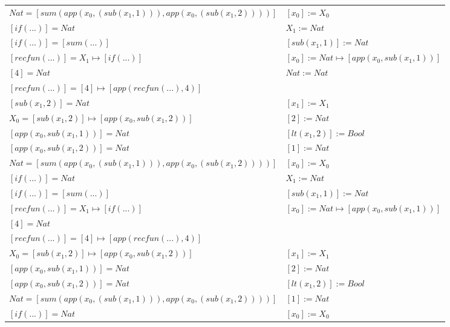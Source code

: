 \begin{exercise}
\begin{description}
\begin{center}
\begin{longtable}{ | l | l | }
                        $Nat = [sum(app(x_0, (sub(x_1,1))), app(x_0, (sub(x_1,2))))]$ & $[x_0] := X_0$ \\
                        $[if(...)] = Nat$ & $X_1 := Nat$ \\
                        $[if(...)] = [sum(...)]$ & $[sub(x_1,1)] := Nat$ \\
                        $[recfun(...)] = X_1 \mapsto [if(...)]$ & $[x_0] := Nat \mapsto [app(x_0, sub(x_1,1))]$  \\
                        $[4] = Nat$ &   $Nat := Nat$ \\
                        $[recfun(...)] = [4] \mapsto [app(recfun(...), 4)]$ & \\
                    \hline
                        $[sub(x_1,2)] = Nat$ & $[x_1] := X_1$ \\
                        $X_0 =  [sub(x_1,2)] \mapsto [app(x_0, sub(x_1,2))]$ &  $[2] := Nat$ \\
                        $[app(x_0, sub(x_1,1))] = Nat$ & $[lt(x_1 , 2)] := Bool$ \\
                        $[app(x_0, sub(x_1,2))] = Nat$ & $[1] := Nat$ \\
                        $Nat = [sum(app(x_0, (sub(x_1,1))), app(x_0, (sub(x_1,2))))]$ & $[x_0] := X_0$ \\
                        $[if(...)] = Nat$ & $X_1 := Nat$ \\
                        $[if(...)] = [sum(...)]$ &  $[sub(x_1,1)] := Nat$ \\
                        $[recfun(...)] = X_1 \mapsto [if(...)]$ &  $[x_0] := Nat \mapsto [app(x_0, sub(x_1,1))]$ \\
                        $[4] = Nat$ & \\
                        $[recfun(...)] = [4] \mapsto [app(recfun(...), 4)]$ & \\
                    \hline
                        $X_0 = [sub(x_1,2)] \mapsto [app(x_0, sub(x_1,2))]$ & $[x_1] := X_1$ \\
                        $[app(x_0, sub(x_1,1))] = Nat$ & $[2] := Nat$ \\
                        $[app(x_0, sub(x_1,2))] = Nat$ & $[lt(x_1 , 2)] := Bool$ \\
                        $Nat = [sum(app(x_0, (sub(x_1,1))), app(x_0, (sub(x_1,2))))]$ & $[1] := Nat$ \\
                        $[if(...)] = Nat$ & $[x_0] := X_0$ \\

\end{longtable}
\end{center}
\end{description}
\end{exercise}
